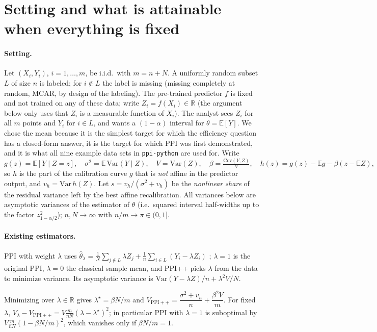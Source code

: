 \section{Setting and what is attainable when everything is fixed}\label{sec:theory}
\paragraph{Setting.}
Let $(X_i,Y_i)$, $i=1,\dots,m$, be i.i.d.\ with $m=n+N$. A uniformly random subset $L$ of size $n$ is labeled; for $i\notin L$ the label is missing (missing completely at random, MCAR, by design of the labeling). The pre-trained predictor $f$ is fixed and not trained on any of these data; write $Z_i=f(X_i)\in\mathbb R$ (the argument below only uses that $Z_i$ is a measurable function of $X_i$). The analyst sees $Z_i$ for all $m$ points and $Y_i$ for $i\in L$, and wants a $(1-\alpha)$ interval for $\theta=\mathbb E[Y]$. We chose the mean because it is the simplest target for which the efficiency question has a closed-form answer, it is the target for which PPI was first demonstrated, and it is what all nine example data sets in \texttt{ppi-python} are used for. Write
\[
g(z)=\mathbb E[Y\mid Z=z],\quad \sigma^2=\mathbb E\,\mathrm{Var}(Y\mid Z),\quad V=\mathrm{Var}(Z),\quad \beta=\tfrac{\mathrm{Cov}(Y,Z)}{V},\quad h(z)=g(z)-\mathbb E g-\beta (z-\mathbb E Z),
\]
so $h$ is the part of the calibration curve $g$ that is \emph{not} affine in the predictor output, and $v_h=\mathrm{Var}\,h(Z)$. Let $s=v_h/(\sigma^2+v_h)$ be the \emph{nonlinear share} of the residual variance left by the best affine recalibration. All variances below are asymptotic variances of the estimator of $\theta$ (i.e.\ squared interval half-widths up to the factor $z_{1-\alpha/2}^2$); $n,N\to\infty$ with $n/m\to\pi\in(0,1]$.

\paragraph{Existing estimators.}
PPI with weight $\lambda$ uses $\hat\theta_\lambda=\frac1N\sum_{j\notin L}\lambda Z_j+\frac1n\sum_{i\in L}(Y_i-\lambda Z_i)$ \citep{angelopoulos2023ppi,angelopoulos2023ppipp}; $\lambda=1$ is the original PPI, $\lambda=0$ the classical sample mean, and PPI++ picks $\lambda$ from the data to minimize variance. Its asymptotic variance is $\mathrm{Var}(Y-\lambda Z)/n+\lambda^2V/N$.

\begin{proposition}\label{prop:ppi}
Minimizing over $\lambda\in\mathbb R$ gives $\lambda^\star=\beta N/m$ and
$V_{\mathrm{PPI++}}=\dfrac{\sigma^2+v_h}{n}+\dfrac{\beta^2V}{m}$. For fixed $\lambda$,
$V_\lambda-V_{\mathrm{PPI++}}=V\frac{m}{nN}(\lambda-\lambda^\star)^2$; in particular PPI with $\lambda=1$ is suboptimal by $V\frac{m}{nN}(1-\beta N/m)^2$, which vanishes only if $\beta N/m=1$.
\end{proposition}

